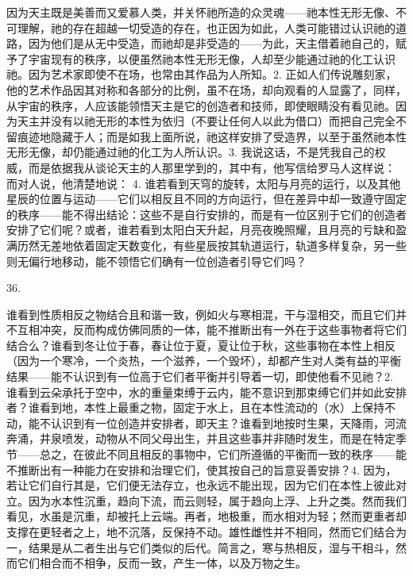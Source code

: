 因为天主既是美善而又爱慕人类，并关怀祂所造的众灵魂——祂本性无形无像、不可理解，祂的存在超越一切受造的存在，也正因为如此，人类可能错过认识祂的道路，因为他们是从无中受造，而祂却是非受造的——为此，天主借着祂自己的，赋予了宇宙现有的秩序，以便虽然祂本性无形无像，人却至少能通过祂的化工认识祂。因为艺术家即使不在场，也常由其作品为人所知。2. 正如人们传说雕刻家，他的艺术作品因其对称和各部分的比例，虽不在场，却向观看的人显露了，同样，从宇宙的秩序，人应该能领悟天主是它的创造者和技师，即使眼睛没有看见祂。因为天主并没有以祂无形的本性为依归（不要让任何人以此为借口）而把自己完全不留痕迹地隐藏于人；而是如我上面所说，祂这样安排了受造界，以至于虽然祂本性无形无像，却仍能通过祂的化工为人所认识。3. 我说这话，不是凭我自己的权威，而是依据我从谈论天主的人那里学到的，其中有，他写信给罗马人这样说： 而对人说，他清楚地说： 4. 谁若看到天穹的旋转，太阳与月亮的运行，以及其他星辰的位置与运动——它们以相反且不同的方向运行，但在差异中却一致遵守固定的秩序——能不得出结论：这些不是自行安排的，而是有一位区别于它们的创造者安排了它们呢？或者，谁若看到太阳白天升起，月亮夜晚照耀，且月亮的亏缺和盈满历然无差地依着固定天数变化，有些星辰按其轨道运行，轨道多样复杂，另一些则无偏行地移动，能不领悟它们确有一位创造者引导它们吗？\par

36. \par

谁看到性质相反之物结合且和谐一致，例如火与寒相混，干与湿相交，而且它们并不互相冲突，反而构成仿佛同质的一体，能不推断出有一外在于这些事物者将它们结合么？谁看到冬让位于春，春让位于夏，夏让位于秋，这些事物在本性上相反（因为一个寒冷，一个炎热，一个滋养，一个毁坏），却都产生对人类有益的平衡结果——能不认识到有一位高于它们者平衡并引导着一切，即使他看不见祂？2. 谁看到云朵承托于空中，水的重量束缚于云内，能不意识到那束缚它们并如此安排者？谁看到地，本性上最重之物，固定于水上，且在本性流动的（水）上保持不动，能不认识到有一位创造并安排者，即天主？谁看到地按时生果，天降雨，河流奔涌，井泉喷发，动物从不同父母出生，并且这些事并非随时发生，而是在特定季节——总之，在彼此不同且相反的事物中，它们所遵循的平衡而一致的秩序——能不推断出有一种能力在安排和治理它们，使其按自己的旨意妥善安排？4. 因为，若让它们自行其是，它们便无法存立，也永远不能出现，因为它们在本性上彼此对立。因为水本性沉重，趋向下流，而云则轻，属于趋向上浮、上升之类。然而我们看见，水虽是沉重，却被托上云端。再者，地极重，而水相对为轻；然而更重者却支撑在更轻者之上，地不沉落，反保持不动。雄性雌性并不相同，然而它们结合为一，结果是从二者生出与它们类似的后代。简言之，寒与热相反，湿与干相斗，然而它们相合而不相争，反而一致，产生一体，以及万物之生。\par

